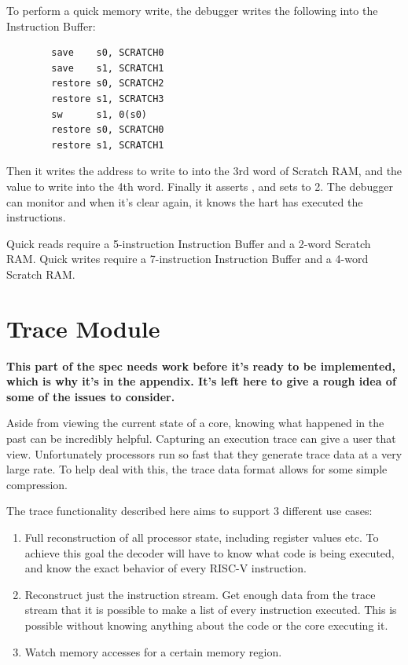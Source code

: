 \documentclass{article}
\begin{document}
To perform a quick memory write, the debugger writes the following into the
Instruction Buffer:
\begin{verbatim}
        save    s0, SCRATCH0
        save    s1, SCRATCH1
        restore s0, SCRATCH2
        restore s1, SCRATCH3
        sw      s1, 0(s0)
        restore s0, SCRATCH0
        restore s1, SCRATCH1
\end{verbatim}
Then it writes the address to write to into the 3rd word of Scratch RAM, and
the value to write into the 4th word.  Finally it asserts \Fibufenable, and
sets \Fibufaction to 2. The debugger can monitor \Fibufenable and when it's
clear again, it knows the hart has executed the instructions.

Quick reads require a 5-instruction Instruction Buffer and a 2-word Scratch
RAM.  Quick writes require a 7-instruction Instruction Buffer and a 4-word
Scratch RAM.

\section{Trace Module}

{\bf This part of the spec needs work before it's ready to be implemented,
which is why it's in the appendix. It's left here to give a rough idea of some
of the issues to consider.}

Aside from viewing the current state of a core, knowing what happened in the
past can be incredibly helpful. Capturing an execution trace can give a user
that view.  Unfortunately processors run so fast that they generate trace data
at a very large rate. To help deal with this, the trace data format allows for
some simple compression.

The trace functionality described here aims to support 3 different use cases:
\begin{enumerate}
    \item Full reconstruction of all processor state, including register values
        etc. To achieve this goal the decoder will have to know what code is
        being executed, and know the exact behavior of every RISC-V
        instruction.
    \item Reconstruct just the instruction stream. Get enough data from the
        trace stream that it is possible to make a list of every instruction
        executed.  This is possible without knowing anything about the code or
        the core executing it.
    \item Watch memory accesses for a certain memory region.
\end{enumerate}
\end{document}
